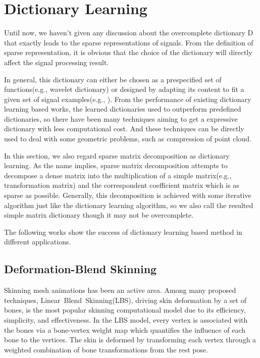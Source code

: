 \section{Dictionary Learning}
\label{sec:DictionaryLearning}

Until now, we haven't given any discussion about the overcomplete dictionary D that exactly leads to the sparse representations of signals.
From the definition of sparse representation, it is obvious that the choice of the dictionary will directly affect the signal processing result.

In general, this dictionary can either be chosen as a prespecified set of functions(e.g., wavelet dictionary) or designed by adapting its content to fit a given set of signal examples(e.g., \cite{aharon2006svd}).
From the performance of existing dictionary learning based works, the learned dictionaries used to outperform predefined dictionaries,
so there have been many techniques aiming to get a expressive dictionary with less computational cost.
And these techniques can be directly used to deal with some geometric problems, such as compression of point cloud\cite{digne2014self}.

In this section, we also regard sparse matrix decomposition as dictionary learning.
As the name implies, sparse matrix decomposition attempts to decompose a dense matrix into the multiplication of a simple matrix(e.g., transformation matrix\cite{le2012smooth}) and the correspondent coefficient matrix which is as sparse as possible.
Generally, this decomposition is achieved with some iterative algorithm just like the dictionary learning algorithm,
so we also call the resulted simple matrix dictionary though it may not be overcomplete.

The following works show the success of dictionary learning based method in different applications.

\subsection{Deformation-Blend Skinning}
\label{subsec:LBS}

Skinning mesh animations has been an active area.
Among many proposed techniques, Linear~Blend~Skinning(LBS), driving skin deformation by a set of bones, is the most popular skinning computational model due to its efficiency, simplicity, and effectiveness.
In the LBS model, every vertex is associated with the bones via a bone-vertex weight map which quantifies the influence of each bone to the vertices.
The skin is deformed by transforming each vertex through a weighted combination of bone transformations from the rest pose.

